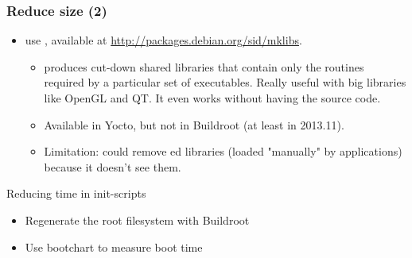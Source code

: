 \begin{frame}
\frametitle{Reduce size (2)}
\begin{itemize}
	\item use , available at
		\url{http://packages.debian.org/sid/mklibs}.
		\begin{itemize}
		\item {} produces cut-down shared libraries that contain
		only the routines required by a particular set of executables.
		Really useful with big libraries like OpenGL and QT. It even
		works without having the source code.
  		\item Available in Yocto, but not in Buildroot (at least
                in 2013.11).
                \item Limitation:  could remove ed libraries
                (loaded "manually" by applications) because it doesn't see them.
		\end{itemize}
\end{itemize}
\end{frame}

\setuplabframe
{Reducing time in init-scripts}
{
\begin{itemize}
\item Regenerate the root filesystem with Buildroot
\item Use bootchart to measure boot time
\end{itemize}
}


